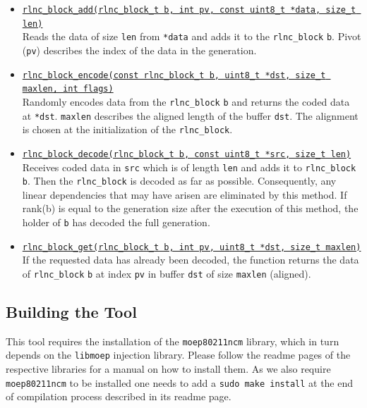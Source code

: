 \documentclass[a4paper,english,10pt]{tumarticle}
\begin{document}
\begin{itemize}
    \item \underline{\texttt{rlnc\_block\_add(rlnc\_block\_t b, int pv, const uint8\_t *data, size\_t len)}}\\
    Reads the data of size \texttt{len} from \texttt{*data} and adds it to the \texttt{rlnc\_block} \texttt{b}. Pivot (\texttt{pv}) describes the index of the data in the generation.

    \item \underline{\texttt{rlnc\_block\_encode(const rlnc\_block\_t b, uint8\_t *dst, size\_t maxlen, int flags)}}\\
    Randomly encodes data from the \texttt{rlnc\_block} \texttt{b} and returns the coded data at \texttt{*dst}. 
    \texttt{maxlen} describes the aligned length of the buffer \texttt{dst}. The alignment is chosen at the initialization of the \texttt{rlnc\_block}.
    
    \item \underline{\texttt{rlnc\_block\_decode(rlnc\_block\_t b, const uint8\_t *src, size\_t len)}}\\
    Receives coded data in \texttt{src} which is of length \texttt{len} and adds it to \texttt{rlnc\_block} \texttt{b}. 
    Then the \texttt{rlnc\_block} is decoded as far as possible. 
    Consequently, any linear dependencies that may have arisen are eliminated by this method. If rank(b) is 
    equal to the generation size after the execution of this method, the holder of \texttt{b} has decoded the full generation.

    \item \underline{\texttt{rlnc\_block\_get(rlnc\_block\_t b, int pv, uint8\_t *dst, size\_t maxlen)}}\\
    If the requested data has already been decoded, the function returns the data of \texttt{rlnc\_block} \texttt{b} at index \texttt{pv} in buffer 
    \texttt{dst} of size \texttt{maxlen} (aligned).
  \end{itemize}

\subsection{Building the Tool}\label{app:build}
This tool requires the installation of the \texttt{moep80211ncm} library, which in turn depends on the \texttt{libmoep} injection library. Please follow the readme pages of the respective libraries for a manual on how to install them. As we also require \texttt{moep80211ncm} to be installed one needs to add a
\texttt{sudo make install}
at the end of compilation process described in its readme page.\\
\end{document}
